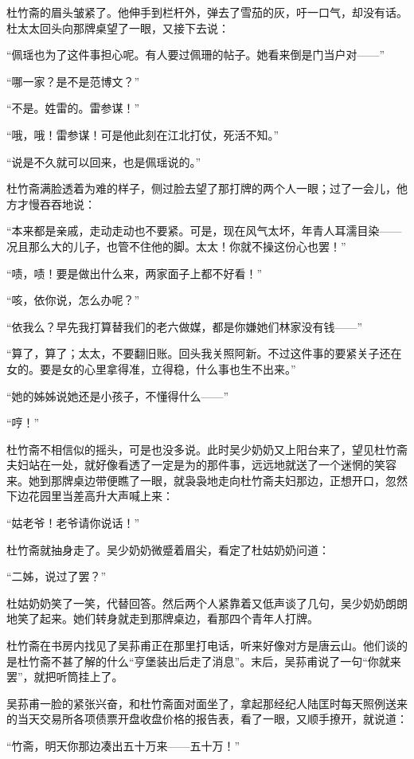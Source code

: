 \par 杜竹斋的眉头皱紧了。他伸手到栏杆外，弹去了雪茄的灰，吁一口气，却没有话。杜太太回头向那牌桌望了一眼，又接下去说：
\par “佩瑶也为了这件事担心呢。有人要过佩珊的帖子。她看来倒是门当户对——”
\par “哪一家？是不是范博文？”
\par “不是。姓雷的。雷参谋！”
\par “哦，哦！雷参谋！可是他此刻在江北打仗，死活不知。”
\par “说是不久就可以回来，也是佩瑶说的。”
\par 杜竹斋满脸透着为难的样子，侧过脸去望了那打牌的两个人一眼；过了一会儿，他方才慢吞吞地说：
\par “本来都是亲戚，走动走动也不要紧。可是，现在风气太坏，年青人耳濡目染——况且那么大的儿子，也管不住他的脚。太太！你就不操这份心也罢！”
\par “啧，啧！要是做出什么来，两家面子上都不好看！”
\par “咳，依你说，怎么办呢？”
\par “依我么？早先我打算替我们的老六做媒，都是你嫌她们林家没有钱——”
\par “算了，算了；太太，不要翻旧账。回头我关照阿新。不过这件事的要紧关子还在女的。要是女的心里拿得准，立得稳，什么事也生不出来。”
\par “她的姊姊说她还是小孩子，不懂得什么——”
\par “哼！”
\par 杜竹斋不相信似的摇头，可是也没多说。此时吴少奶奶又上阳台来了，望见杜竹斋夫妇站在一处，就好像看透了一定是为的那件事，远远地就送了一个迷惘的笑容来。她到那牌桌边带便瞧了一眼，就袅袅地走向杜竹斋夫妇那边，正想开口，忽然下边花园里当差高升大声喊上来：
\par “姑老爷！老爷请你说话！”
\par 杜竹斋就抽身走了。吴少奶奶微蹙着眉尖，看定了杜姑奶奶问道：
\par “二姊，说过了罢？”
\par 杜姑奶奶笑了一笑，代替回答。然后两个人紧靠着又低声谈了几句，吴少奶奶朗朗地笑了起来。她们转身就走到那牌桌边，看那四个青年人打牌。
\par 杜竹斋在书房内找见了吴荪甫正在那里打电话，听来好像对方是唐云山。他们谈的是杜竹斋不甚了解的什么“亨堡装出后走了消息”。末后，吴荪甫说了一句“你就来罢”，就把听筒挂上了。
\par 吴荪甫一脸的紧张兴奋，和杜竹斋面对面坐了，拿起那经纪人陆匡时每天照例送来的当天交易所各项债票开盘收盘价格的报告表，看了一眼，又顺手撩开，就说道：
\par “竹斋，明天你那边凑出五十万来——五十万！”
